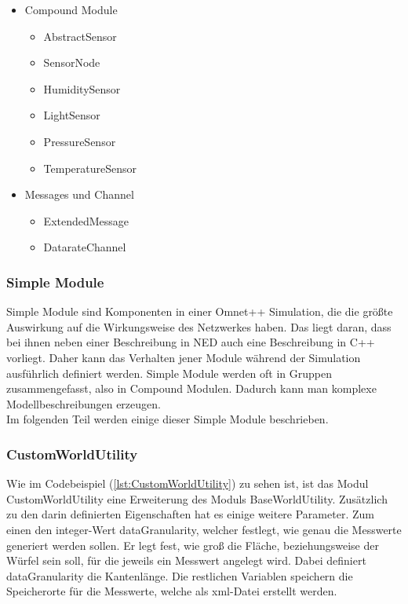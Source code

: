 \begin{minipage}{\textwidth}
\begin{itemize}{\label{enum:NedModules}}
\begin{multicols}{2}
\begin{itemize}
\end{itemize}
\end{multicols}
\item Compound Module
\begin{multicols}{2}
\begin{itemize}
\item AbstractSensor
\item SensorNode
\item HumiditySensor
\item LightSensor
\item PressureSensor
\item TemperatureSensor 
\end{itemize}
\end{multicols}
\item Messages und Channel
\begin{multicols}{2}
\begin{itemize}
\item ExtendedMessage
\item DatarateChannel
\end{itemize}
\end{multicols}
\end{itemize}
\end{minipage}

\subsubsection{Simple Module}

Simple Module sind Komponenten in einer Omnet++ Simulation, die die größte Auswirkung auf die Wirkungsweise des Netzwerkes haben. Das liegt daran, dass bei ihnen neben einer Beschreibung in NED auch eine Beschreibung in C++ vorliegt. Daher kann das Verhalten jener Module während der Simulation ausführlich definiert werden. Simple Module werden oft in Gruppen zusammengefasst, also in Compound Modulen. Dadurch kann man komplexe Modellbeschreibungen erzeugen.\\
Im folgenden Teil werden einige dieser Simple Module beschrieben.

\subsubsection{CustomWorldUtility}

Wie im Codebeispiel (\ref{lst:CustomWorldUtility}) zu sehen ist, ist das Modul CustomWorldUtility eine Erweiterung des Moduls BaseWorldUtility. Zusätzlich zu den darin definierten Eigenschaften hat es einige weitere Parameter. Zum einen den integer-Wert dataGranularity, welcher festlegt, wie genau die Messwerte generiert werden sollen. Er legt fest, wie groß die Fläche, beziehungsweise  der Würfel sein soll, für die jeweils ein Messwert angelegt wird. Dabei definiert dataGranularity die Kantenlänge. Die restlichen Variablen speichern die Speicherorte für die Messwerte, welche als xml-Datei erstellt werden.

